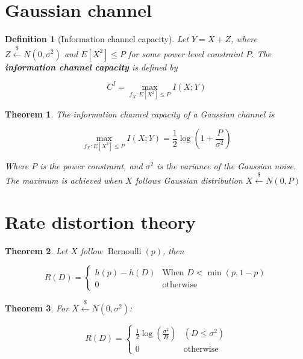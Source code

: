 \documentclass{article}
\newcommand{\leftsample}{\overset{{\scriptscriptstyle\$}}{\leftarrow}}
\newtheorem{definition}{Definition}[section]
\newtheorem{theorem}{Theorem}[section]
\begin{document}
\section{Gaussian channel}
\begin{definition}[Information channel capacity]
    Let $Y = X + Z$, where $Z \leftsample N(0, \sigma^2)$ and $E[X^2] \leq P$ for some power level constraint $P$. The \textbf{information channel capacity} is defined by

    $$
    C^I = \max_{f_X : E[X^2] \leq P} I(X; Y)
    $$
\end{definition}

\begin{theorem}
    The information channel capacity of a Gaussian channel is

    \begin{equation}
        \max_{f_X: E[X^2] \leq P} I(X; Y) = \frac{1}{2}\log{(1 + \frac{P}{\sigma^2})}
    \end{equation}

    Where $P$ is the power constraint, and $\sigma^2$ is the variance of the Gaussian noise. The maximum is achieved when $X$ follows Gaussian distribution $X \leftsample N(0, P)$
\end{theorem}

\section{Rate distortion theory}
\begin{theorem}
    Let $X$ follow $\operatorname{Bernoulli}(p)$, then

    $$
    R(D) = \begin{cases}
        h(p) - h(D)  & \text{When $D < \min(p, 1-p)$} \\
        0   &  \text{otherwise}
    \end{cases}
$$
\end{theorem}

\begin{theorem}
    For $X \leftsample N(0, \sigma^2)$:

    $$
    R(D) = \begin{cases}
        \frac{1}{2}\log(\frac{\sigma^2}{D}) & (D \leq \sigma^2) \\
        0 & \text{otherwise}
    \end{cases}
    $$
\end{theorem}
\end{document}
